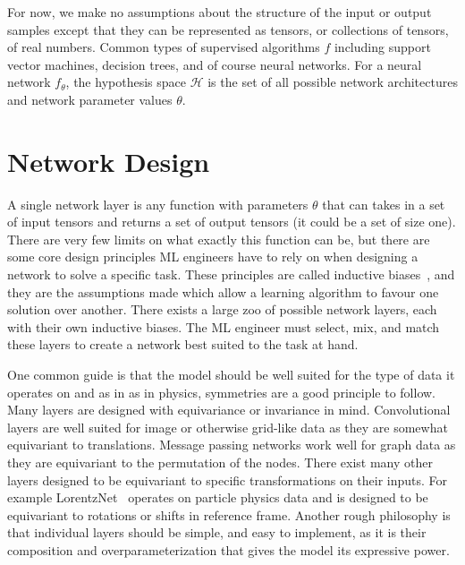 For now, we make no assumptions about the structure of the input or output samples except that they can be represented as tensors, or collections of tensors, of real numbers.
Common types of supervised algorithms $f$ including support vector machines, decision trees, and of course neural networks.
For a neural network $f_{\theta}$, the hypothesis space $\mathcal{H}$ is the set of all possible network architectures and network parameter values $\theta$.

\section{Network Design}

A single network layer is any function with parameters $\theta$ that can takes in a set of input tensors and returns a set of output tensors (it could be a set of size one).
There are very few limits on what exactly this function can be, but there are some core design principles ML engineers have to rely on when designing a network to solve a specific task.
These principles are called inductive biases~\cite{InductiveBiases1, InductiveBiases2}, and they are the assumptions made which allow a learning algorithm to favour one solution over another.
There exists a large zoo of possible network layers, each with their own inductive biases.
The ML engineer must select, mix, and match these layers to create a network best suited to the task at hand.

One common guide is that the model should be well suited for the type of data it operates on and as in as in physics, symmetries are a good principle to follow.
Many layers are designed with equivariance or invariance in mind.
Convolutional layers are well suited for image or otherwise grid-like data as they are somewhat equivariant to translations.
Message passing networks work well for graph data as they are equivariant to the permutation of the nodes.
There exist many other layers designed to be equivariant to specific transformations on their inputs.
For example LorentzNet~\cite{LorentzNet} operates on particle physics data and is designed to be equivariant to rotations or shifts in reference frame.
Another rough philosophy is that individual layers should be simple, and easy to implement, as it is their composition and overparameterization that gives the model its expressive power.

